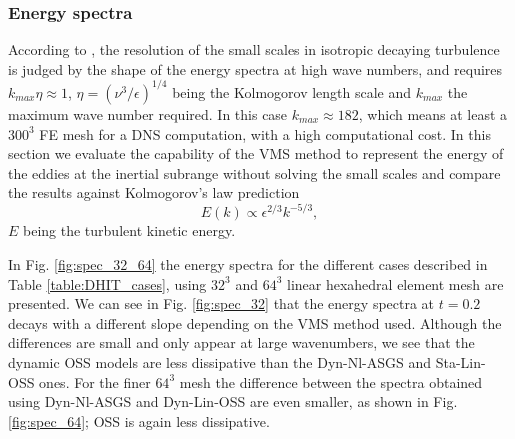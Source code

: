 \subsubsection{Energy spectra}
According to \cite{mansour_decay_1994}, the resolution of the small scales in isotropic decaying turbulence is judged by the shape of the energy spectra at high wave numbers, and requires 
$k_{max}\eta\approx1$, $\eta=(\nu^3/\epsilon)^{1/4}$ being the Kolmogorov length scale and $k_{max}$ the maximum wave number required. In this case $k_{max}\approx182$, which means at least a $300^3$ FE mesh for a DNS computation, with a high computational cost.
In this section we evaluate the capability of the VMS method to represent the energy of the  eddies at the inertial subrange without solving the small scales and compare the results against Kolmogorov's law prediction
$$E(k)\propto\epsilon^{2/3}k^{-5/3},$$
$E$ being the turbulent kinetic energy.

In Fig. \ref{fig:spec_32_64} the energy spectra for the different cases described in Table \ref{table:DHIT_cases}, using $32^3$ and $64^3$ linear hexahedral element mesh are presented. 
We can see in Fig. \ref{fig:spec_32} that the energy spectra at $t=0.2$ decays with a different slope depending on the VMS method used. Although the differences are small and only appear at large wavenumbers, we see that the dynamic OSS models are less dissipative than the Dyn-Nl-ASGS and Sta-Lin-OSS ones. 
For the finer $64^3$ mesh the difference between the spectra obtained using Dyn-Nl-ASGS and Dyn-Lin-OSS are even smaller, as shown in Fig. \ref{fig:spec_64}; OSS is again less dissipative.

